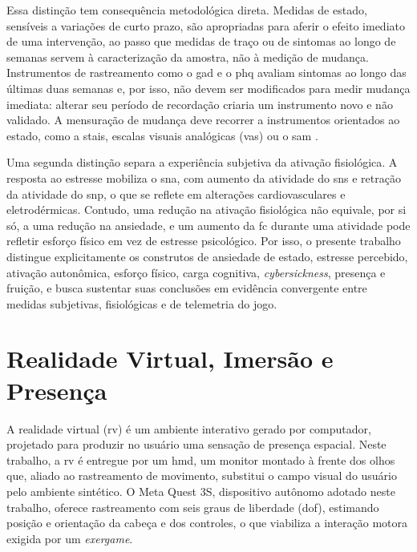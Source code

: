 Essa distinção tem consequência metodológica direta. Medidas de estado, sensíveis a variações de curto prazo, são apropriadas para aferir o efeito imediato de uma intervenção, ao passo que medidas de traço ou de sintomas ao longo de semanas servem à caracterização da amostra, não à medição de mudança. Instrumentos de rastreamento como o \gls{gad} \citep{Spitzer2006} e o \gls{phq} \citep{Kroenke2001} avaliam sintomas ao longo das últimas duas semanas e, por isso, não devem ser modificados para medir mudança imediata: alterar seu período de recordação criaria um instrumento novo e não validado. A mensuração de mudança deve recorrer a instrumentos orientados ao estado, como a \gls{stais}, escalas visuais analógicas (\gls{vas}) ou o \gls{sam} \citep{Marteau1992,Facco2011,BradleyLang1994}.

Uma segunda distinção separa a experiência subjetiva da ativação fisiológica. A resposta ao estresse mobiliza o \gls{sna}, com aumento da atividade do \gls{sns} e retração da atividade do \gls{snp}, o que se reflete em alterações cardiovasculares e eletrodérmicas. Contudo, uma redução na ativação fisiológica não equivale, por si só, a uma redução na ansiedade, e um aumento da \gls{fc} durante uma atividade pode refletir esforço físico em vez de estresse psicológico. Por isso, o presente trabalho distingue explicitamente os construtos de ansiedade de estado, estresse percebido, ativação autonômica, esforço físico, carga cognitiva, \textit{cybersickness}, presença e fruição, e busca sustentar suas conclusões em evidência convergente entre medidas subjetivas, fisiológicas e de telemetria do jogo.

\section{Realidade Virtual, Imersão e Presença}\label{sec:fund-rv}

A realidade virtual (\gls{rv}) é um ambiente interativo gerado por computador, projetado para produzir no usuário uma sensação de presença espacial. Neste trabalho, a \gls{rv} é entregue por um \gls{hmd}, um monitor montado à frente dos olhos que, aliado ao rastreamento de movimento, substitui o campo visual do usuário pelo ambiente sintético. O Meta Quest 3S, dispositivo autônomo adotado neste trabalho, oferece rastreamento com seis graus de liberdade (\gls{dof}), estimando posição e orientação da cabeça e dos controles, o que viabiliza a interação motora exigida por um \textit{exergame}.

